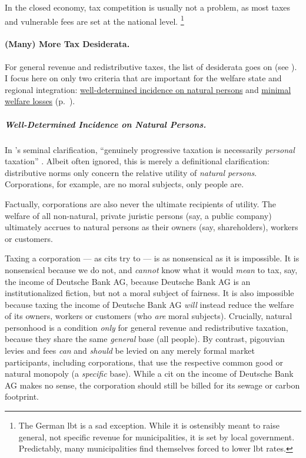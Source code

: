 In the closed economy, tax competition is usually not a problem, as most taxes and vulnerable fees are set at the national level.
\footnote{
	The German \gls{lbt} is a sad exception.
	While it is ostensibly meant to raise general, not specific revenue for municipalities, it is set by local government.
	Predictably, many municipalities find themselves forced to lower \gls{lbt} rates.
}

\paragraph[Tax Desiderata]{(Many) More Tax Desiderata.}
For general revenue and redistributive taxes, the list of desiderata goes on (see \citealt{Held2010a}).
I focus here on only two criteria that are important for the welfare state and regional integration:
\hyperref[sec:well-determined-incidence]{well-determined incidence on natural persons} and \hyperref[sec:minimal-DWL]{minimal welfare losses} (p.~\pageref{sec:minimal-DWL}).

\subparagraph[Incidence]{Well-Determined Incidence on Natural Persons.}
	\label{sec:well-determined-incidence}
In \citeauthor{Vickrey1947}'s seminal clarification, ``genuinely progressive taxation is necessarily \emph{personal} taxation'' \citeyearpar[1, emphasis added]{Vickrey1947}.
Albeit often ignored, this is merely a definitional clarification:
distributive norms only concern the relative utility of \emph{natural persons}.
Corporations, for example, are no moral subjects, only people are.

Factually, corporations are also never the ultimate recipients of utility.
The welfare of all non-natural, private juristic persons (say, a public company) ultimately accrues to natural persons as their owners (say, shareholders), workers or customers.

Taxing a corporation --- as \glspl{cit} try to --- is as nonsensical as it is impossible.
It is nonsensical because we do not, and \emph{cannot} know what it would \emph{mean} to tax, say, the income of Deutsche Bank AG, because Deutsche Bank AG is an institutionalized fiction, but not a moral subject of fairness.
It is also impossible because taxing the income of Deutsche Bank AG \emph{will} instead reduce the welfare of its owners, workers or customers (who \emph{are} moral subjects).
Crucially, natural personhood is a condition \emph{only} for general revenue and redistributive taxation, because they share the same \emph{general} base (all people).
By contrast, pigouvian levies and fees \emph{can} and \emph{should} be levied on any merely formal market participants, including corporations, that use the respective common good or natural monopoly (a \emph{specific} base).
While a \gls{cit} on the income of Deutsche Bank AG makes no sense, the corporation should still be billed for its sewage or carbon footprint.

